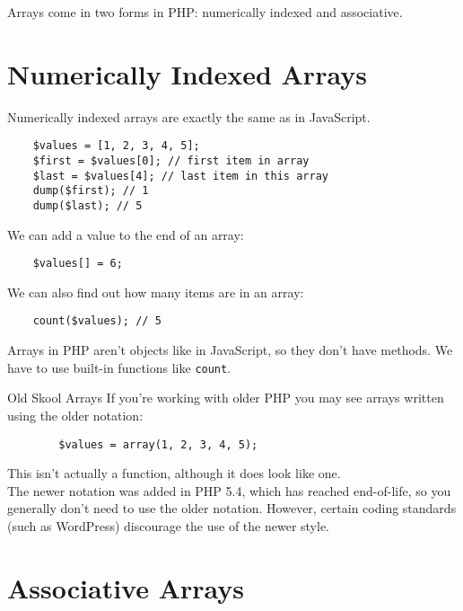 Arrays come in two forms in PHP: numerically indexed and associative.
\\


\section{Numerically Indexed Arrays}

Numerically indexed arrays are exactly the same as in JavaScript.

\begin{verbatim}
    $values = [1, 2, 3, 4, 5];
    $first = $values[0]; // first item in array
    $last = $values[4]; // last item in this array
    dump($first); // 1
    dump($last); // 5
\end{verbatim}

We can add a value to the end of an array:

\begin{verbatim}
    $values[] = 6;
\end{verbatim}

We can also find out how many items are in an array:

\begin{verbatim}
    count($values); // 5
\end{verbatim}

Arrays in PHP aren't objects like in JavaScript, so they don't have methods. We have to use built-in functions like \texttt{count}.


\begin{infobox}{Old Skool Arrays}
    If you're working with older PHP you may see arrays written using the older notation:

    \begin{verbatim}
        $values = array(1, 2, 3, 4, 5);
    \end{verbatim}

    This isn't actually a function, although it does look like one.
    \\

    The newer notation was added in PHP 5.4, which has reached end-of-life, so you generally don't need to use the older notation. However, certain coding standards (such as WordPress) discourage the use of the newer style.
\end{infobox}

\section{Associative Arrays}

